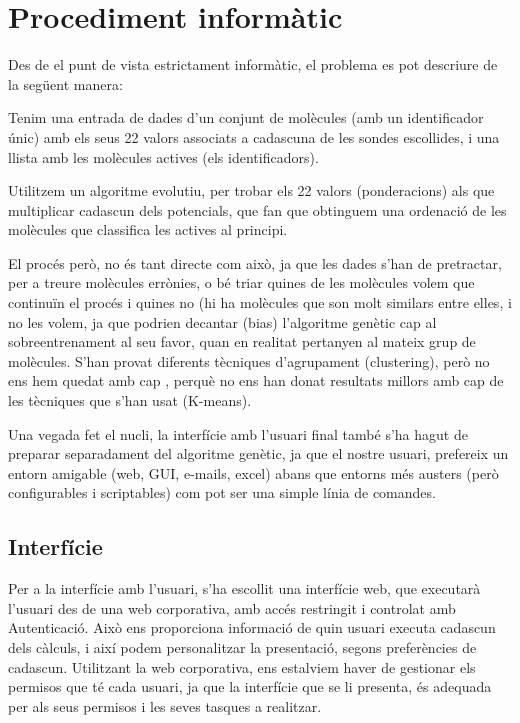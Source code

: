 \section{Procediment informàtic} %
\label{sec:Procediment informatic}

Des de el punt de vista estrictament informàtic, el problema es pot descriure de
la següent manera:

Tenim una entrada de dades d'un conjunt de molècules (amb un identificador
únic) amb els seus 22 valors associats a cadascuna de les sondes escollides, i una
llista amb les molècules actives (els identificadors).

Utilitzem un algoritme evolutiu, per trobar els 22 valors (ponderacions) als que
multiplicar cadascun dels potencials, que fan que obtinguem una ordenació de les
molècules que classifica les actives al principi.

El procés però, no és tant directe com això, ja que les dades s'han de
pretractar, per a treure molècules errònies, o bé triar quines de les molècules
volem que continuïn el procés i quines no (hi ha molècules que son molt similars
entre elles, i no les volem, ja que podrien decantar (bias) l'algoritme genètic cap al
sobreentrenament al seu favor, quan en realitat pertanyen al mateix grup de
molècules.  S'han provat diferents tècniques d'agrupament (clustering), però no ens hem
quedat amb cap , perquè no ens han donat resultats millors amb cap de les
tècniques que s'han usat (K-means).

Una vegada fet el nucli, la interfície amb l'usuari final també s'ha hagut
de preparar separadament del algoritme genètic, ja que el nostre usuari,
prefereix un entorn amigable (web, GUI, e-mails, excel) abans que entorns més
austers (però configurables i scriptables) com pot ser una simple línia de
comandes.  

\subsection{Interfície} %
\label{sub:Interficie}

Per a la interfície amb l'usuari, s'ha escollit una interfície web, que executarà
l'usuari des de una web corporativa, amb accés restringit i controlat amb
Autenticació.  Això ens proporciona informació de quin usuari executa cadascun
dels càlculs, i així podem personalitzar la presentació, segons preferències de
cadascun.  Utilitzant la web corporativa, ens estalviem haver de gestionar els
permisos que té cada usuari, ja que la interfície que se li presenta, és
adequada per als seus permisos i les seves tasques a realitzar.

